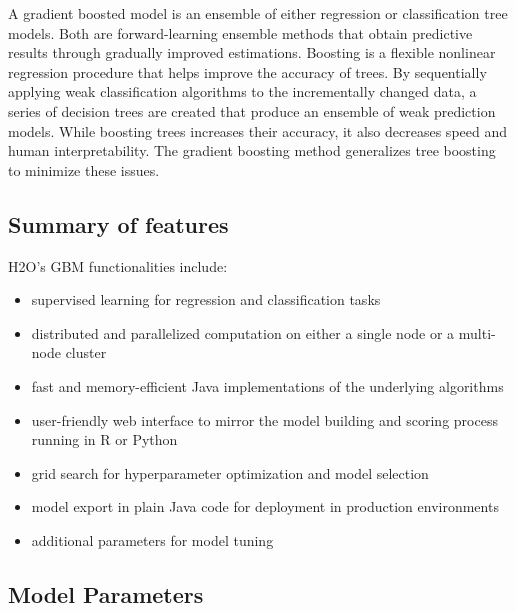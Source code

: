 A gradient boosted model is an ensemble of either regression or classification tree models.
Both are forward-learning ensemble methods that obtain predictive results through gradually improved estimations.
Boosting is a flexible nonlinear regression procedure that helps improve the accuracy of trees.
By sequentially applying weak classification algorithms to the incrementally changed data,
a series of decision trees are created that produce an ensemble of weak prediction models.
While boosting trees increases their accuracy, it also decreases speed and human interpretability.
The gradient boosting method generalizes tree boosting to minimize these issues.

\subsection{Summary of features}
H2O's GBM functionalities include:

\begin{itemize}
\item supervised learning for regression and classification tasks
\item distributed and parallelized computation on either a single node or a multi-node cluster
\item fast and memory-efficient Java implementations of the underlying algorithms
\item user-friendly web interface to mirror the model building and scoring process running in R or Python
\item grid search for hyperparameter optimization and model selection
\item model export in plain Java code for deployment in production environments
\item additional parameters for model tuning
\end{itemize}

\subsection{ Model Parameters}

